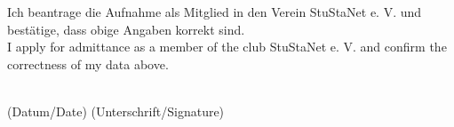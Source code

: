 \documentclass[a4paper,10pt]{scrartcl}
\let\xhrf\hrulefill
\let\hrulefill\xhrf
\begin{document}
\vfill


{\Large Ich beantrage die Aufnahme als Mitglied in den Verein StuStaNet e. V. und bestätige, dass obige Angaben korrekt sind.\\
I apply for admittance as a member of the club StuStaNet e. V. and confirm the correctness of my data above.}

\vspace{3em}

\hrulefill \\
(Datum/Date) \hfill (Unterschrift/Signature) 

\vfill

\enlargethispage{40pt}

\end{document}
